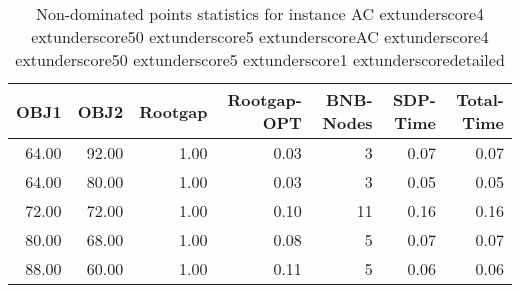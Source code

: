 \begin{table}
\caption{Non-dominated points statistics for instance AC	extunderscore4	extunderscore50	extunderscore5	extunderscoreAC	extunderscore4	extunderscore50	extunderscore5	extunderscore1	extunderscoredetailed}
\label{tab:stats/AC_4_50_5_AC_4_50_5_1_detailed}
\begin{tabular}{rrrrrrr}
\toprule
OBJ1 & OBJ2 & Rootgap & Rootgap-OPT & BNB-Nodes & SDP-Time & Total-Time \\
\midrule
64.00 & 92.00 & 1.00 & 0.03 & 3 & 0.07 & 0.07 \\
64.00 & 80.00 & 1.00 & 0.03 & 3 & 0.05 & 0.05 \\
72.00 & 72.00 & 1.00 & 0.10 & 11 & 0.16 & 0.16 \\
80.00 & 68.00 & 1.00 & 0.08 & 5 & 0.07 & 0.07 \\
88.00 & 60.00 & 1.00 & 0.11 & 5 & 0.06 & 0.06 \\
\bottomrule
\end{tabular}
\end{table}
